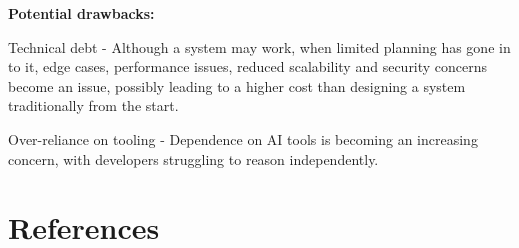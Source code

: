 \documentclass[10pt,a4paper]{article}
\begin{document}
\textbf{Potential drawbacks:}

\newline Technical debt - Although a system may work, when limited planning has gone in to it, edge cases, performance issues, reduced scalability and security concerns become an issue, possibly leading to a higher cost than designing a system traditionally from the start.

\newline Over-reliance on tooling - Dependence on AI tools is becoming an increasing concern, with developers struggling to reason independently.

\section{References}

\end{document}
